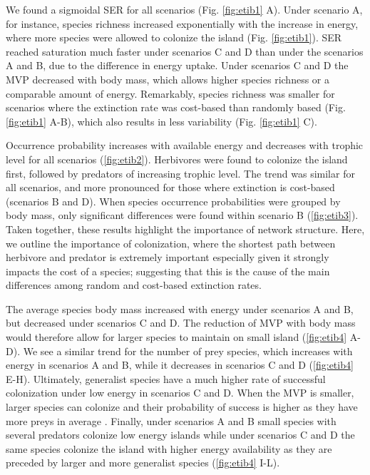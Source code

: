 We found a sigmoidal SER for all scenarios (Fig. \ref{fig:etib1} A).
Under scenario A, for instance, species richness increased exponentially
with the increase in energy, where more species were allowed to colonize
the island (Fig. \ref{fig:etib1}). SER reached saturation much faster
under scenarios C and D than under the scenarios A and B, due to the
difference in energy uptake. Under scenarios C and D the MVP decreased
with body mass, which allows higher species richness or a comparable
amount of energy. Remarkably, species richness was smaller for scenarios
where the extinction rate was cost-based than randomly based (Fig.
\ref{fig:etib1} A-B), which also results in less variability (Fig.
\ref{fig:etib1} C).

Occurrence probability increases with available energy and decreases
with trophic level for all scenarios (\ref{fig:etib2}). Herbivores were
found to colonize the island first, followed by predators of increasing
trophic level. The trend was similar for all scenarios, and more
pronounced for those where extinction is cost-based (scenarios B and D).
When species occurrence probabilities were grouped by body mass, only
significant differences were found within scenario B (\ref{fig:etib3}).
Taken together, these results highlight the importance of network
structure. Here, we outline the importance of colonization, where the
shortest path between herbivore and predator is extremely important
especially given it strongly impacts the cost of a species; suggesting
that this is the cause of the main differences among random and
cost-based extinction rates.

The average species body mass increased with energy under scenarios A
and B, but decreased under scenarios C and D. The reduction of MVP with
body mass would therefore allow for larger species to maintain on small
island (\ref{fig:etib4} A-D). We see a similar trend for the number of
prey species, which increases with energy in scenarios A and B, while it
decreases in scenarios C and D (\ref{fig:etib4} E-H). Ultimately,
generalist species have a much higher rate of successful colonization
under low energy in scenarios C and D. When the MVP is smaller, larger
species can colonize and their probability of success is higher as they
have more preys in average \citep[due to the use of the niche model and
body mass as the niche axis][]{Williams2000, Gravel2013}. Finally, under
scenarios A and B small species with several predators colonize low
energy islands while under scenarios C and D the same species colonize
the island with higher energy availability as they are preceded by
larger and more generalist species (\ref{fig:etib4} I-L).

